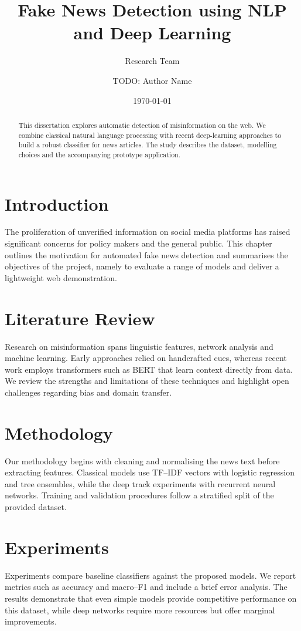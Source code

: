 \documentclass{report}
\title{Fake News Detection using NLP and Deep Learning}
\author{Research Team}
\author{TODO: Author Name}
\date{\today}
\begin{document}
\maketitle
\begin{abstract}

This dissertation explores automatic detection of misinformation on the web.
We combine classical natural language processing with recent deep-learning
approaches to build a robust classifier for news articles.  The study describes
the dataset, modelling choices and the accompanying prototype application.
\end{abstract}
\tableofcontents

\chapter{Introduction}
The proliferation of unverified information on social media platforms has
raised significant concerns for policy makers and the general public.  This
chapter outlines the motivation for automated fake news detection and
summarises the objectives of the project, namely to evaluate a range of models
and deliver a lightweight web demonstration.

\chapter{Literature Review}
Research on misinformation spans linguistic features, network analysis and
machine learning.  Early approaches relied on handcrafted cues, whereas recent
work employs transformers such as BERT that learn context directly from data.
We review the strengths and limitations of these techniques and highlight open
challenges regarding bias and domain transfer.

\chapter{Methodology}
Our methodology begins with cleaning and normalising the news text before
extracting features.  Classical models use TF--IDF vectors with logistic
regression and tree ensembles, while the deep track experiments with recurrent
neural networks.  Training and validation procedures follow a stratified split
of the provided dataset.

\chapter{Experiments}
Experiments compare baseline classifiers against the proposed models.  We report
metrics such as accuracy and macro--F1 and include a brief error analysis.  The
results demonstrate that even simple models provide competitive performance on
this dataset, while deep networks require more resources but offer marginal
improvements.
\end{document}
